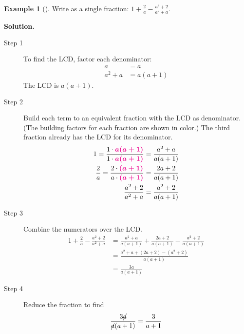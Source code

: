 \documentclass[10pt,]{book}
\theoremstyle{plain}
\theoremstyle{definition}
\theoremstyle{definition}
\newtheorem{example}[theorem]{Example}
\theoremstyle{definition}
\numberwithin{equation}{part}
\newcommand{\alert}[1]{\boldsymbol{\color{magenta}{#1}}}
\newcommand{\amp}{&}
\begin{document}
\begin{example}[]\label{example-66}
Write as a single fraction: \(\displaystyle{1 + \frac{2}{a}−\frac{a^2 + 2}{a^2 + a}}\).%
\par\medskip\noindent%
\textbf{Solution.}\quad \leavevmode%
\begin{description}
\item[{Step 1}]\hypertarget{li-317}{}To find the LCD, factor each denominator:%
\begin{align*}
a\amp =a\\
a^2 + a\amp = a (a + 1)
\end{align*}
The LCD is \(a(a + 1)\).%
\item[{Step 2}]\hypertarget{li-318}{}Build each term to an equivalent fraction with the LCD as denominator. (The building factors for each fraction are shown in color.) The third fraction already has the LCD for its denominator.%
\begin{align*}
1 = \frac{1 \cdot \alert{a (a + 1)}}{1 \cdot\alert{a (a + 1)}}\amp =\frac{a^2+a} {a (a + 1)}
\\
\frac{2}{a}=\frac{2\cdot\alert{(a+1)} }{a\cdot\alert{(a+1)}}\amp =\frac{2a+2}{a(a+1)}
\\
\frac{a^2 + 2}{a^2 + a} \amp = \frac{a^2 + 2}{a(a+1)}
\end{align*}
%
\item[{Step 3}]\hypertarget{li-319}{}Combine the numerators over the LCD.%
\begin{align*}
1 + \frac{2}{a}−\frac{a^2 + 2}{a^2 + a} \amp = \frac{a^2+a} {a (a + 1)} + \frac{2a+2}{a(a+1)}- \frac{a^2 + 2}{a(a+1)}
\\
\amp = \frac{a^2+a +(2a+2)-(a^2+2) } {a (a + 1)}
\\
\amp = \frac{3a} {a (a + 1)}
\end{align*}
%
\item[{Step 4}]\hypertarget{li-320}{}Reduce the fraction to find%
\begin{equation*}
\frac{3\cancel{a}}{\cancel{a}(a+1)}=\frac{3}{a+1}
\end{equation*}
%
\end{description}
%
\end{example}
\typeout{************************************************}
\typeout{************************************************}
\end{document}
